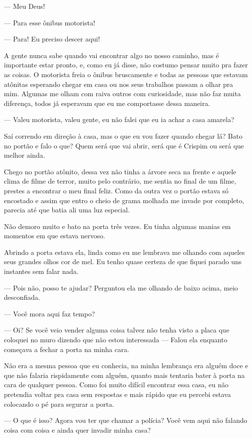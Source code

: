 — Meu Deus!

— Para esse ônibus motorista!

— Para! Eu preciso descer aqui!

A gente nunca sabe quando vai encontrar algo no nosso caminho, mas é importante estar pronto, e, como eu já disse, não costumo pensar muito pra fazer as coisas. O motorista freia o ônibus bruscamente e todas as pessoas que estavam atônitas esperando chegar em casa ou nos seus trabalhos passam a olhar pra mim. Algumas me olham com raiva outros com curiosidade, mas não faz muita diferença, todos já esperavam que eu me comportasse dessa maneira.

— Valeu motorista, valeu gente, eu não falei que eu ia achar a casa amarela?

Saí correndo em direção à casa, mas o que eu vou fazer quando chegar lá? Bato no portão e falo o que? Quem será que vai abrir, será que é Crispim ou será que melhor ainda.

Chego no portão atônito, dessa vez não tinha a árvore seca na frente e aquele clima de filme de terror, muito pelo contrário, me sentia no final de um filme, prestes a encontrar o meu final feliz. Como da outra vez o portão estava só encostado e assim que entro o cheio de grama molhada me invade por completo, parecia até que batia ali uma luz especial.

Não demoro muito e bato na porta três vezes. Eu tinha algumas manias em momentos em que estava nervoso.

Abrindo a porta estava ela, linda como eu me lembrava me olhando com aqueles seus grandes olhos cor de mel. Eu tenho quase certeza de que fiquei parado uns instantes sem falar nada.

— Pois não, posso te ajudar? Perguntou ela me olhando de baixo acima, meio desconfiada.

— Você mora aqui faz tempo?

— Oi? Se você veio vender alguma coisa talvez não tenha visto a placa que coloquei no muro dizendo que não estou interessada — Falou ela enquanto começava a fechar a porta na minha cara.

Não era a mesma pessoa que eu conhecia, na minha lembrança era alguém doce e que não falaria rispidamente com alguém, quanto mais tentaria bater à porta na cara de qualquer pessoa. Como foi muito difícil encontrar essa casa, eu não pretendia voltar pra casa sem respostas e mais rápido que eu percebi estava colocando o pé para segurar a porta.

— O que é isso? Agora vou ter que chamar a polícia? Você vem aqui não falando coisa com coisa e ainda quer invadir minha casa?

